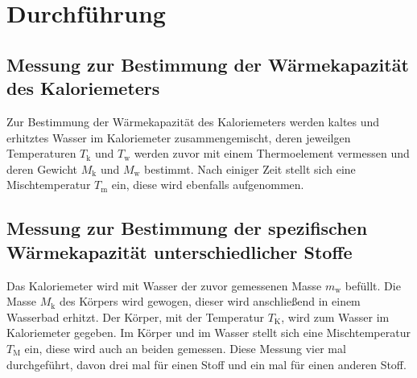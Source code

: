 \section{Durchführung}
\label{sec:Durchführung}
\subsection{Messung zur Bestimmung der Wärmekapazität des Kaloriemeters}
Zur Bestimmung der Wärmekapazität des Kaloriemeters werden kaltes und erhitztes
Wasser im Kaloriemeter zusammengemischt, deren jeweilgen Temperaturen
$T_{\mathrm{k}}$ und $T_{\mathrm{w}}$ werden zuvor mit einem
Thermoelement vermessen und deren Gewicht $M_{\mathrm{k}}$ und $M_{\mathrm{w}}$
bestimmt. Nach einiger Zeit stellt sich eine Mischtemperatur $T_{\mathrm{m}}$
ein, diese wird ebenfalls aufgenommen.

\subsection{Messung zur Bestimmung der spezifischen Wärmekapazität unterschiedlicher Stoffe}
Das Kaloriemeter wird mit Wasser der zuvor gemessenen Masse $m_{\mathrm{w}}$ befüllt.
Die Masse $M_\mathrm{k}$ des Körpers wird gewogen, dieser wird anschließend in einem
Wasserbad erhitzt. Der Körper, mit der Temperatur $T_{\mathrm{K}}$, wird zum Wasser
im Kaloriemeter gegeben. Im Körper und im Wasser stellt sich eine Mischtemperatur
$T_{\mathrm{M}}$ ein, diese wird auch an beiden gemessen.
Diese Messung vier mal durchgeführt, davon drei mal für einen Stoff und ein mal für einen
anderen Stoff.
